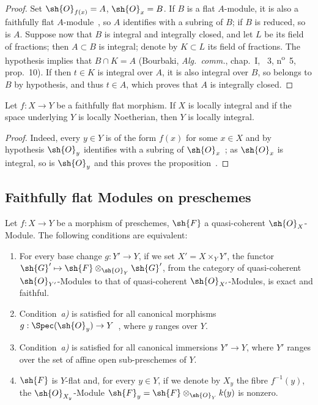 \begin{proof}
Set $\sh{O}_{f(x)}=A$, $\sh{O}_x=B$.
If $B$ is a flat $A$-module, it is also a faithfully flat $A$-module~, so $A$ identifies with a subring of $B$; if $B$ is reduced, so is $A$.
Suppose now that $B$ is integral and integrally closed, and let $L$ be its field of fractions; then $A\subset B$ is integral; denote by $K\subset L$ its field of fractions.
The hypothesis implies that $B\cap K=A$ (Bourbaki, \emph{Alg.~comm.}, chap.~I, \textsection~3, n\textsuperscript{o}~5, prop.~10).
If then $t\in K$ is integral over $A$, it is also integral over $B$, so belongs to $B$ by hypothesis, and thus $t\in A$, which proves that $A$ is integrally closed.
\end{proof}

\begin{proposition}[2.1.14]
\label{IV.2.1.14}
Let $f:X\to Y$ be a faithfully flat morphism. If $X$ is locally integral and if the space underlying $Y$ is locally Noetherian, then $Y$ is locally integral.
\end{proposition}

\begin{proof}
Indeed, every $y\in Y$ is of the form $f(x)$ for some $x\in X$ and by hypothesis $\sh{O}_y$ identifies with a subring of $\sh{O}_x$~; as $\sh{O}_x$ is integral, so is $\sh{O}_y$ and this proves the proposition~.
\end{proof}

\subsection{Faithfully flat Modules on preschemes}
\label{subsection:IV.2.2}

\begin{proposition}[2.2.1]
\label{IV.2.2.1}
Let $f:X\to Y$ be a morphism of preschemes, $\sh{F}$ a quasi-coherent $\sh{O}_X$-Module. The following conditions are equivalent:
\begin{enumerate}
  \item[\emph{a)}] For every base change $g:Y'\to Y$, if we set $X'=X\times_Y Y'$, the functor $\sh{G}'\mapsto\sh{F}\otimes_{\sh{O}_Y}\sh{G}'$, from the category of quasi-coherent $\sh{O}_{Y'}$-Modules to that of quasi-coherent $\sh{O}_{X'}$-Modules, is exact and faithful.
  \item[\emph{a$'$)}] Condition~\emph{a)} is satisfied for all canonical morphisms $g:\Spec(\sh{O}_y)\to Y$~, where $y$ ranges over $Y$.
  \item[\emph{a$''$)}] Condition~\emph{a)} is satisfied for all canonical immersions $Y'\to Y$, where $Y'$ ranges over the set of affine open sub-preschemes of $Y$.
  \item[\emph{b)}] $\sh{F}$ is $Y$-flat and, for every $y\in Y$, if we denote by $X_y$ the fibre $f^{-1}(y)$, the $\sh{O}_{X_y}$-Module $\sh{F}_y=\sh{F}\otimes_{\sh{O}_Y}k(y)$ is nonzero.
\end{enumerate}
\end{proposition}

